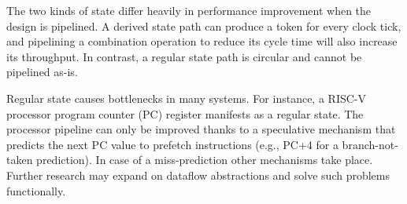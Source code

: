 The two kinds of state differ heavily in performance improvement when the design is pipelined. A derived state path can produce a token for every clock tick, and pipelining a combination operation to reduce its cycle time will also increase its throughput. In contrast, a regular state path is circular and cannot be pipelined as-is. 

Regular state causes bottlenecks in many systems. For instance, a RISC-V processor program counter (PC) register manifests as a regular state. The processor pipeline can only be improved thanks to a speculative mechanism that predicts the next PC value to prefetch instructions (e.g., PC+4 for a branch-not-taken prediction). In case of a miss-prediction other mechanisms take place. Further research may expand on dataflow abstractions and solve such problems functionally.



